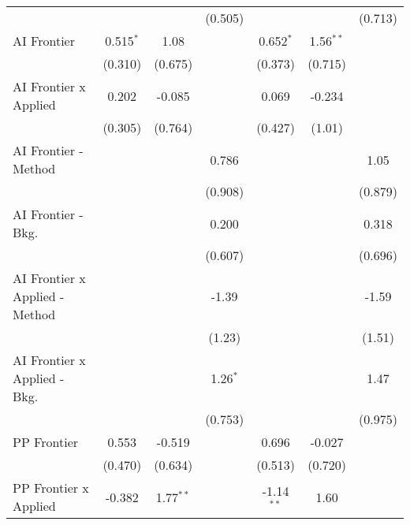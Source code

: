 \begin{tabular}{lcccccc}
                                  &              &               & (0.505)       &              &               & (0.713)\\   
   AI Frontier                    & 0.515$^{*}$  & 1.08          &               & 0.652$^{*}$  & 1.56$^{**}$   &   \\   
                                  & (0.310)      & (0.675)       &               & (0.373)      & (0.715)       &   \\   
   AI Frontier x Applied          & 0.202        & -0.085        &               & 0.069        & -0.234        &   \\   
                                  & (0.305)      & (0.764)       &               & (0.427)      & (1.01)        &   \\   
   AI Frontier - Method           &              &               & 0.786         &              &               & 1.05\\   
                                  &              &               & (0.908)       &              &               & (0.879)\\   
   AI Frontier - Bkg.             &              &               & 0.200         &              &               & 0.318\\   
                                  &              &               & (0.607)       &              &               & (0.696)\\   
   AI Frontier x Applied - Method &              &               & -1.39         &              &               & -1.59\\   
                                  &              &               & (1.23)        &              &               & (1.51)\\   
   AI Frontier x Applied - Bkg.   &              &               & 1.26$^{*}$    &              &               & 1.47\\   
                                  &              &               & (0.753)       &              &               & (0.975)\\   
   PP Frontier                    & 0.553        & -0.519        &               & 0.696        & -0.027        &   \\   
                                  & (0.470)      & (0.634)       &               & (0.513)      & (0.720)       &   \\   
   PP Frontier x Applied          & -0.382       & 1.77$^{**}$   &               & -1.14$^{**}$ & 1.60          &   \\   

\end{tabular}
